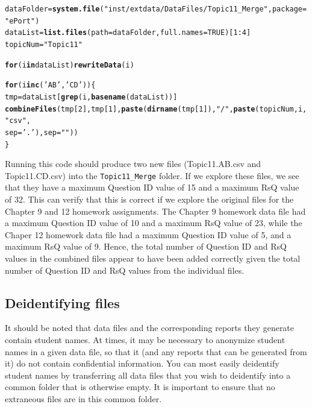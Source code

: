\documentclass{article}\usepackage[]{graphicx}\usepackage[]{color}
\makeatletter
\newcommand{\hlnum}[1]{\textcolor[rgb]{0.686,0.059,0.569}{#1}}%
\newcommand{\hlstr}[1]{\textcolor[rgb]{0.192,0.494,0.8}{#1}}%
\newcommand{\hlopt}[1]{\textcolor[rgb]{0,0,0}{#1}}%
\newcommand{\hlstd}[1]{\textcolor[rgb]{0.345,0.345,0.345}{#1}}%
\newcommand{\hlkwa}[1]{\textcolor[rgb]{0.161,0.373,0.58}{\textbf{#1}}}%
\newcommand{\hlkwb}[1]{\textcolor[rgb]{0.69,0.353,0.396}{#1}}%
\newcommand{\hlkwc}[1]{\textcolor[rgb]{0.333,0.667,0.333}{#1}}%
\newcommand{\hlkwd}[1]{\textcolor[rgb]{0.737,0.353,0.396}{\textbf{#1}}}%
\newenvironment{kframe}{%
 \def\at@end@of@kframe{}%
 \ifinner\ifhmode%
  \def\at@end@of@kframe{\end{minipage}}%
  \begin{minipage}{\columnwidth}%
 \fi\fi%
 \def\FrameCommand##1{\hskip\@totalleftmargin \hskip-\fboxsep
 \colorbox{shadecolor}{##1}\hskip-\fboxsep
     \hskip-\linewidth \hskip-\@totalleftmargin \hskip\columnwidth}%
 \MakeFramed {\advance\hsize-\width
   \@totalleftmargin\z@ \linewidth\hsize
   \@setminipage}}%
 {\par\unskip\endMakeFramed%
 \at@end@of@kframe}
\newenvironment{knitrout}{}{} %
\numberwithin{equation}{section} %
\makeatother
\begin{document}
\begin{knitrout}
\color{fgcolor}\begin{kframe}
\begin{alltt}
\hlstd{dataFolder} \hlkwb{=} \hlkwd{system.file}\hlstd{(}\hlstr{"inst/extdata/DataFiles/Topic11_Merge"}\hlstd{,} \hlkwc{package}\hlstd{=}\hlstr{"ePort"}\hlstd{)}
\hlstd{dataList} \hlkwb{=} \hlkwd{list.files}\hlstd{(}\hlkwc{path} \hlstd{= dataFolder,} \hlkwc{full.names}\hlstd{=}\hlnum{TRUE}\hlstd{)[}\hlnum{1}\hlopt{:}\hlnum{4}\hlstd{]}
\hlstd{topicNum} \hlkwb{=} \hlstr{"Topic11"}

\hlkwa{for} \hlstd{(i} \hlkwa{in} \hlstd{dataList)} \hlkwd{rewriteData}\hlstd{(i)}

\hlkwa{for}\hlstd{(i} \hlkwa{in} \hlkwd{c}\hlstd{(}\hlstr{'AB'}\hlstd{,} \hlstr{'CD'}\hlstd{))\{}
  \hlstd{tmp} \hlkwb{=} \hlstd{dataList[}\hlkwd{grep}\hlstd{(i,} \hlkwd{basename}\hlstd{(dataList))]}
  \hlkwd{combineFiles}\hlstd{(tmp[}\hlnum{2}\hlstd{], tmp[}\hlnum{1}\hlstd{],} \hlkwd{paste}\hlstd{(}\hlkwd{dirname}\hlstd{(tmp[}\hlnum{1}\hlstd{]),} \hlstr{"/"}\hlstd{,} \hlkwd{paste}\hlstd{(topicNum, i,} \hlstr{"csv"}\hlstd{,}
    \hlkwc{sep} \hlstd{=} \hlstr{'.'}\hlstd{),} \hlkwc{sep} \hlstd{=} \hlstr{""}\hlstd{))}
\hlstd{\}}
\end{alltt}
\end{kframe}
\end{knitrout}

Running this code should produce two new files (Topic11.AB.csv and Topic11.CD.csv) into the \texttt{Topic11\_Merge} folder. If we explore these files, we see that they have a maximum Question ID value of 15 and a maximum RsQ value of 32. This can verify that this is correct if we explore the original files for the Chapter 9 and 12 homework assignments. The Chapter 9 homework data file had a maximum Question ID value of 10 and a maximum RsQ value of 23, while the Chaper 12 homework data file had a maximum Question ID value of 5, and a maximum RsQ value of 9. Hence, the total number of Question ID and RsQ values in the combined files appear to have been added correctly given the total number of Question ID and RsQ values from the individual files.

\subsection{Deidentifying files}

It should be noted that data files and the corresponding reports they generate contain student names. At times, it may be necessary to anonymize student names in a given data file, so that it (and any reports that can be generated from it) do not contain confidential information. You can most easily deidentify student names by transferring all data files that you wish to deidentify into a common folder that is otherwise empty. It is important to ensure that no extraneous files are in this common folder. \\
\end{document}
